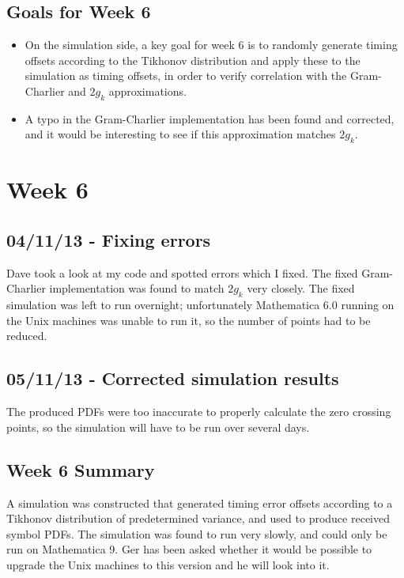 \subsection{Goals for Week 6}

\begin{itemize}
\itemsep1pt\parskip0pt
\item
  On the simulation side, a key goal for week 6 is to randomly generate
  timing offsets according to the Tikhonov distribution and apply these
  to the simulation as timing offsets, in order to verify correlation
  with the Gram-Charlier and $2 g_k$ approximations.
\item
  A typo in the Gram-Charlier implementation has been found and
  corrected, and it would be interesting to see if this approximation
  matches $2 g_k$.
\end{itemize}

\section{Week 6}

\subsection{04/11/13 - Fixing errors}

Dave took a look at my code and spotted errors which I fixed. The fixed
Gram-Charlier implementation was found to match $2 g_k$ very closely.
The fixed simulation was left to run overnight; unfortunately
Mathematica 6.0 running on the Unix machines was unable to run it, so
the number of points had to be reduced.

\subsection{05/11/13 - Corrected simulation results}

The produced PDFs were too inaccurate to properly calculate the zero
crossing points, so the simulation will have to be run over several
days.

\subsection{Week 6 Summary}

A simulation was constructed that generated timing error offsets
according to a Tikhonov distribution of predetermined variance, and used
to produce received symbol PDFs. The simulation was found to run very
slowly, and could only be run on Mathematica 9. Ger has been asked
whether it would be possible to upgrade the Unix machines to this
version and he will look into it.

